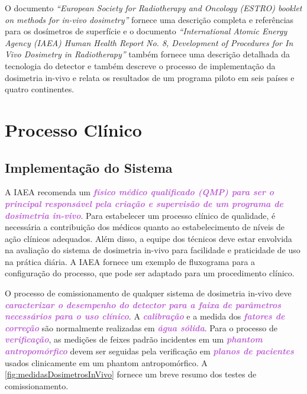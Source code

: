 \documentclass[11pt,a4paper]{article}
\newcounter{exemplo}
\begin{document}
	O documento \textit{``European Society for Radiotherapy and Oncology (ESTRO) booklet on methods for in-vivo dosimetry''} fornece uma descrição completa e referências para os dosímetros de superfície e o documento \textit{``International Atomic Energy Agency (IAEA) Human Health Report No. 8, Development of Procedures for In Vivo Dosimetry in Radiotherapy''} também fornece uma descrição detalhada da tecnologia do detector e também descreve o processo de implementação da dosimetria in-vivo e relata os resultados de um programa piloto em seis países e quatro continentes.


\section{Processo Clínico}

\subsection*{Implementação do Sistema}

	A IAEA recomenda um \textcolor{MediumOrchid}{\textbf{\textit{físico médico qualificado (QMP) para ser o principal responsável pela criação e supervisão de um programa de dosimetria in-vivo}}}. Para estabelecer um processo clínico de qualidade, é necessária a contribuição dos médicos quanto ao estabelecimento de níveis de ação clínicos adequados. Além disso, a equipe dos técnicos deve estar envolvida na avaliação do sistema de dosimetria in-vivo para facilidade e praticidade de uso na prática  diária. A IAEA fornece um exemplo de fluxograma para a configuração do processo, que pode ser adaptado para um procedimento clínico.

	O processo de comissionamento de qualquer sistema de dosimetria in-vivo deve \textcolor{MediumOrchid}{\textbf{\textit{caracterizar o desempenho do detector para a faixa de parâmetros necessários para o uso clínico}}}. A \textcolor{MediumOrchid}{\textbf{\textit{calibração}}} e a medida dos \textcolor{MediumOrchid}{\textbf{\textit{fatores de correção}}} são normalmente realizadas em \textcolor{MediumOrchid}{\textbf{\textit{água sólida}}}. Para o processo de \textcolor{MediumOrchid}{\textbf{\textit{verificação}}}, as medições de feixes padrão incidentes em um \textcolor{MediumOrchid}{\textbf{\textit{phantom antropomórfico}}} devem ser seguidas pela verificação em \textcolor{MediumOrchid}{\textbf{\textit{planos de pacientes}}} usados clinicamente em um phantom antropomórfico. A \ref{fig:medidasDosimetrosInVivo} fornece um breve resumo dos testes de comissionamento.
\end{document}
